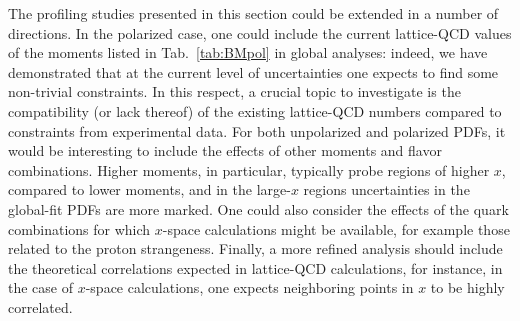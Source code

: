 The profiling studies presented in this section could be extended in
a number of directions.
%
In the polarized case, one could include the current lattice-QCD
values of the moments listed in Tab.~\ref{tab:BMpol} in global analyses: 
indeed, we have demonstrated that at the current level of uncertainties one 
expects to find some non-trivial constraints.
%
In this respect, a crucial topic to investigate is the compatibility 
(or lack thereof) of the existing lattice-QCD numbers compared to constraints 
from experimental data.
%
For both unpolarized and polarized PDFs, it would be interesting to include the 
effects of other moments and flavor combinations.
%
Higher moments, in particular, typically probe regions of higher $x$, compared
to lower moments, and in the large-$x$ regions uncertainties in the global-fit 
PDFs are more marked.
%
One could also consider the effects of the quark combinations for which 
$x$-space calculations might be available, for example those related to the 
proton strangeness.
%
Finally, a more refined analysis should include the theoretical correlations
expected in lattice-QCD calculations, for instance, in the case of $x$-space 
calculations, one expects neighboring points in $x$ to be highly correlated.


